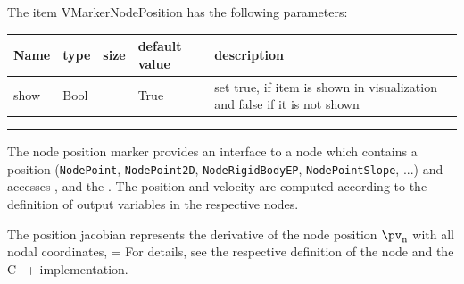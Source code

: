 \noindent The item VMarkerNodePosition has the following parameters:
\begin{center}
  \footnotesize
  \begin{longtable}{| p{4.5cm} | p{2.5cm} | p{0.5cm} | p{2.5cm} | p{6cm} |}
    \hline
    \bf Name & \bf type & \bf size & \bf default value & \bf description \\ \hline
    show &     Bool &      &     True &     set true, if item is shown in visualization and false if it is not shown\\ \hline
\end{longtable}
\end{center}
\par\noindent\rule{\textwidth}{0.4pt}
\label{description_MarkerNodePosition}
 \noindent
    The node position marker provides an interface to a node which contains a position
    (\texttt{NodePoint}, \texttt{NodePoint2D}, \texttt{NodeRigidBodyEP}, \texttt{NodePointSlope}, ...)
    and accesses ,  and the .
    The position and velocity are computed according to the definition of output variables in the respective nodes.
    
    The position jacobian represents the derivative of the node position $\pv_\mathrm{n}$ with all nodal coordinates,
    \be
       = 
    \ee
    For details, see the respective definition of the node and the C++ implementation.
    
